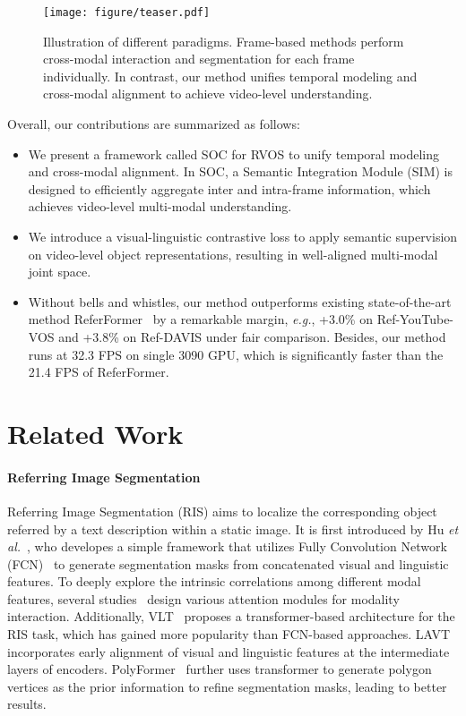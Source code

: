 \documentclass{article}
\begin{document}
\begin{figure*}
    \centering
    \texttt{[image: figure/teaser.pdf]}
    \caption{Illustration of different paradigms. Frame-based methods perform cross-modal interaction and segmentation for each frame individually. In contrast, our method unifies temporal modeling and cross-modal alignment to achieve video-level understanding.}
    \label{fig:teaser}
    \vspace{-10pt}
\end{figure*}

Overall, our contributions are summarized as follows:
\begin{itemize}
    \item We present a framework called SOC for RVOS to unify temporal modeling and cross-modal alignment. In SOC, a Semantic Integration Module (SIM) is designed to efficiently aggregate inter and intra-frame information, which achieves video-level multi-modal understanding. 
    \item We introduce a visual-linguistic contrastive loss to apply semantic supervision on video-level object representations, resulting in well-aligned multi-modal joint space. 
    \item Without bells and whistles, our method outperforms existing state-of-the-art method ReferFormer~\cite{referformer} by a remarkable margin, \textit{e.g.}, +3.0\%  on Ref-YouTube-VOS and +3.8\%  on Ref-DAVIS under fair comparison. Besides, our method runs at 32.3 FPS on single 3090 GPU, which is significantly faster than the 21.4 FPS of ReferFormer.
\end{itemize}



\section{Related Work}
\paragraph{Referring Image Segmentation}
Referring Image Segmentation (RIS) aims to localize the corresponding object referred by a text description within a static image. It is first introduced by Hu \textit{et al.}~\cite{hu16}, who developes a simple framework that utilizes Fully Convolution Network (FCN)~\cite{fcn} to generate segmentation masks from concatenated visual and linguistic features. To deeply explore the intrinsic correlations among different modal features, several studies~\cite{Ding19, hu20, cris, yecmsa} design various attention modules for modality interaction. Additionally, VLT~\cite{vlticcv} proposes a transformer-based architecture for the RIS task, which has gained more popularity than FCN-based approaches. LAVT~\cite{lavt} incorporates early alignment of visual and linguistic features at the intermediate layers of encoders. PolyFormer~\cite{polyformer} further uses transformer to generate polygon vertices as the prior information to refine segmentation masks, leading to better results.      
\end{document}
